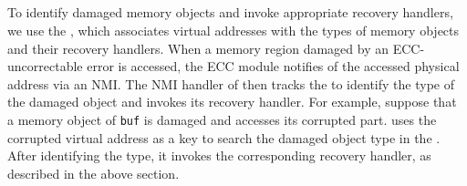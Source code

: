 



\subsection{\Alist}
\label{subsec:alist}
To identify damaged memory objects and invoke appropriate recovery handlers, we use the \emph{\alist}, which associates virtual addresses with the types of memory objects and their recovery handlers. When a memory region damaged by an ECC-uncorrectable error is accessed, the ECC module notifies {\sysname} of the accessed physical address via an NMI\@. The NMI handler of {\sysname} then tracks the {\alist} to identify the type of the damaged object and invokes its recovery handler. For example, suppose that a memory object of \texttt{buf} is damaged and {\sysname} accesses its corrupted part. {\sysname} uses the corrupted virtual address as a key to search the damaged object type in the {\alist}. After identifying the type, it invokes the corresponding recovery handler, as described in the above section.

